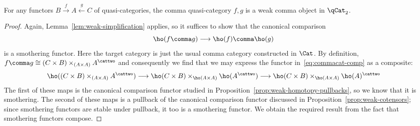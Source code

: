 \begin{prop}\label{prop:weakcomma} For any functors $B \xrightarrow{f} A \xleftarrow{g} C$  of quasi-categories, the comma quasi-category $f\comma g$ is a weak comma object in $\qCat_2$.
\end{prop}
\begin{proof}
    Again, Lemma~\ref{lem:weak-simplification} applies, so it suffices to show that the canonical comparison
  \begin{equation}\label{eq:commacat-comp}
    \ho(f\comma g) \longrightarrow \ho(f)\comma\ho(g)
  \end{equation}
  is a smothering functor. Here the target category is just the usual comma category constructed in $\Cat$. By definition,  $f\comma g \cong (C\times B)\times_{(A\times A)} A^\cattwo$ and consequently we find that we may express the functor in~\eqref{eq:commacat-comp} as a composite:
  \begin{equation*}
    \ho((C\times B)\times_{(A\times A)} A^\cattwo)
    \longrightarrow
    \ho(C\times B)\times_{\ho(A\times A)} \ho(A^\cattwo)
    \longrightarrow
    \ho(C\times B)\times_{\ho(A\times A)} \ho(A)^\cattwo
  \end{equation*}
  The first of these maps is the canonical comparison functor studied in Proposition~\ref{prop:weak-homotopy-pullbacks}, so we know that it is smothering. The second of these maps is a pullback of the canonical comparison functor discussed in Proposition~\ref{prop:weak-cotensors}; since smothering functors are stable under pullback, it too is a smothering functor. We obtain the required result from the fact that smothering functors compose.
\end{proof}


